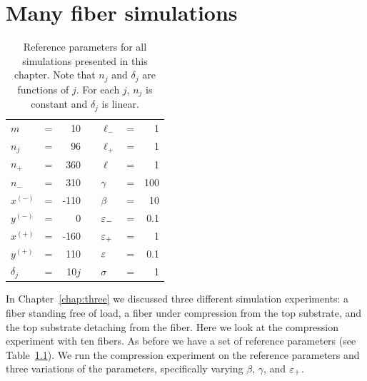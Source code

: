 \chapter{Many fiber simulations} \label{chap:four}

	\begin{table}
		\centering
		\caption{Reference parameters for all simulations presented in this chapter. Note that $n_j$ and $\delta_j$ are functions of $j$. For each $j$, $n_j$ is constant and $\delta_j$ is linear. \label{table:manyfiber_reference}}
		\begin{tabular}{lcrclcr}
			$m$ & = & 10 & \hspace{1in} & $\ell_-$ & = & 1 \\
			$n_j$ & = & 96 & & $\ell_+$ & = & 1 \\
			$n_+$ & = & 360 & & $\ell$ & = & 1 \\
			$n_-$ & = & 310 & & $\gamma$ & = & 100 \\
			$x^{(-)}$ & = & -110 & & $\beta$ & = & 10 \\
			$y^{(-)}$ & = & 0 & & $\varepsilon_-$ & = & 0.1 \\
			$x^{(+)}$ & = & -160 & & $\varepsilon_+$ & = & 1 \\
			$y^{(+)}$ & = & 110 & & $\varepsilon$ & = & 0.1 \\
			$\delta_j$ & = & 10$j$ & & $\sigma$ & = & 1
		\end{tabular}
	\end{table}

	In Chapter~\ref{chap:three} we discussed three different simulation experiments: a fiber standing free of load, a fiber under compression from the top substrate, and the top substrate detaching from the fiber. Here we look at the compression experiment with ten fibers. As before we have a set of reference parameters (see Table~\ref{table:manyfiber_reference}). We run the compression experiment on the reference parameters and three variations of the parameters, specifically varying $\beta$, $\gamma$, and $\varepsilon_+$.

